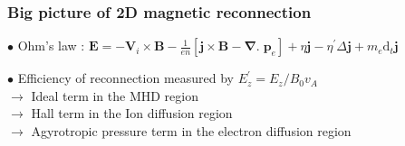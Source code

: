 \documentclass{beamer}
\newcommand{\D}{{\mathrm d}}
\begin{document}
\begin{frame}
\frametitle{Big picture of 2D magnetic reconnection}

$\bullet$ Ohm's law : $\displaystyle \mathbf E = - \mathbf V_i \times \mathbf B - \frac{1}{en} [\mathbf j \times \mathbf B - \boldsymbol{\nabla} . \; \mathbf p_e] + \eta \mathbf j - \eta^{\prime} \Delta \mathbf j + m_e \D _t \mathbf j$ \\[0.2cm]

\begin{center}

\end{center}

$\bullet$ Efficiency  of reconnection measured by $E_z^{\prime} = E_z/B_0 v_A$ \\[0.1cm]
$\to$ Ideal term in the MHD region \\
$\to$ Hall term in the Ion diffusion region \\
$\to$ Agyrotropic pressure term in the electron diffusion region \\

\end{frame}
\end{document}
